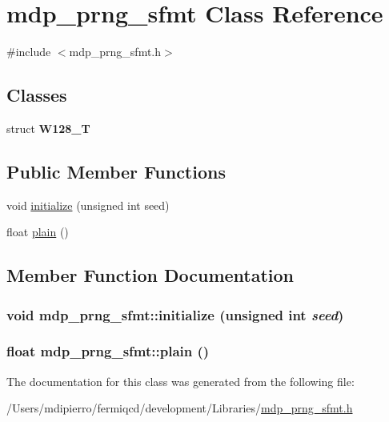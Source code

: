 \hypertarget{classmdp__prng__sfmt}{
\section{mdp\_\-prng\_\-sfmt Class Reference}
\label{classmdp__prng__sfmt}
}


{\ttfamily \#include $<$mdp\_\-prng\_\-sfmt.h$>$}\subsection*{Classes}
\begin{DoxyCompactItemize}
\item 
struct {\bfseries W128\_\-T}
\end{DoxyCompactItemize}
\subsection*{Public Member Functions}
\begin{DoxyCompactItemize}
\item 
void \hyperlink{classmdp__prng__sfmt_a18a792e2e4ec0c846ff57a33b03500f9}{initialize} (unsigned int seed)
\item 
float \hyperlink{classmdp__prng__sfmt_af03ee974f6f6ff50c685457e7805fb35}{plain} ()
\end{DoxyCompactItemize}


\subsection{Member Function Documentation}
\hypertarget{classmdp__prng__sfmt_a18a792e2e4ec0c846ff57a33b03500f9}{
\subsubsection[{initialize}]{\setlength{\rightskip}{0pt plus 5cm}void mdp\_\-prng\_\-sfmt::initialize (unsigned int {\em seed})}}
\label{classmdp__prng__sfmt_a18a792e2e4ec0c846ff57a33b03500f9}
\hypertarget{classmdp__prng__sfmt_af03ee974f6f6ff50c685457e7805fb35}{
\subsubsection[{plain}]{\setlength{\rightskip}{0pt plus 5cm}float mdp\_\-prng\_\-sfmt::plain ()}}
\label{classmdp__prng__sfmt_af03ee974f6f6ff50c685457e7805fb35}


The documentation for this class was generated from the following file:\begin{DoxyCompactItemize}
\item 
/Users/mdipierro/fermiqcd/development/Libraries/\hyperlink{mdp__prng__sfmt_8h}{mdp\_\-prng\_\-sfmt.h}\end{DoxyCompactItemize}
